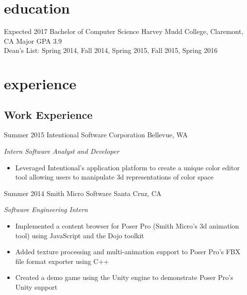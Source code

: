 \documentclass[]{friggeri-cv} %
\begin{document}

\section{education}

\begin{entrylist}


\entry
{Expected 2017}
{Bachelor {\normalfont of Computer Science}}
{Harvey Mudd College, Claremont, CA}
{Major GPA 3.9 \\ Dean's List: Spring 2014, Fall 2014, Spring 2015, Fall 2015, Spring 2016}



\end{entrylist}


\section{experience}

\subsection{Work Experience}

\begin{entrylist}


\entry
{Summer 2015}
{Intentional Software Corporation}
{Bellevue, WA}
{\emph{Intern Software Analyst and Developer}
\begin{itemize}
\item Leveraged Intentional's application platform to create a unique color editor tool allowing users to manipulate 3d representations of color space
\end{itemize}}
\entry
{Summer 2014}
{Smith Micro Software}
{Santa Cruz, CA}
{\emph{Software Engineering Intern}
\begin{itemize}
\item Implemented a content browser for Poser Pro (Smith Micro's 3d animation tool) using JavaScript
and the Dojo toolkit
\item Added texture processing and multi-animation support to Poser Pro's FBX file format exporter using C++
\item Created a demo game using the Unity engine to demonstrate Poser Pro's Unity support
\end{itemize}}


\end{entrylist}
\end{document}
